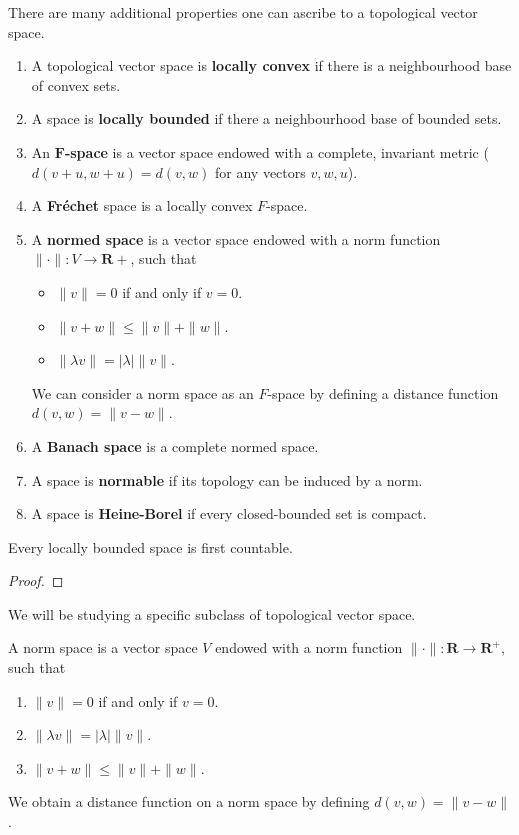 \begin{definition}
    There are many additional properties one can ascribe to a topological vector space.
    \begin{enumerate}
        \item A topological vector space is {\bf locally convex} if there is a neighbourhood base of convex sets.
        \item A space is {\bf locally bounded} if there a neighbourhood base of bounded sets.
        \item An {\bf $\mathbf{F}$-space} is a vector space endowed with a complete, invariant metric ($d(v + u, w + u) = d(v,w)$ for any vectors $v,w,u$).
        \item A {\bf Fr\'{e}chet} space is a locally convex $F$-space.
        \item A {\bf normed space} is a vector space endowed with a norm function $\| \cdotp \|: V \to \mathbf{R}+$, such that
        \begin{itemize}
            \item $\| v \| = 0$ if and only if $v = 0$.
            \item $\| v + w \| \leq \| v \| + \| w \|$.
            \item $\| \lambda v \| = | \lambda | \| v \|$.
        \end{itemize}
        We can consider a norm space as an $F$-space by defining a distance function $d(v,w) = \| v - w \|$.
        \item A {\bf Banach space} is a complete normed space.
        \item A space is {\bf normable} if its topology can be induced by a norm.
        \item A space is {\bf Heine-Borel} if every closed-bounded set is compact.
    \end{enumerate}
\end{definition}

\begin{theorem}
    Every locally bounded space is first countable.
\end{theorem}
\begin{proof}
    
\end{proof}

We will be studying a specific subclass of topological vector space.

\begin{definition}
    A norm space is a vector space $V$ endowed with a norm function $\| \cdotp \|: \mathbf{R} \to \mathbf{R}^+$, such that
    \begin{enumerate}
        \item $\| v \| = 0$ if and only if $v = 0$.
        \item $\| \lambda v \| = | \lambda | \| v \|$.
        \item $\| v + w \| \leq \| v \| + \| w \|$.
    \end{enumerate}
    We obtain a distance function on a norm space by defining $d(v,w) = \| v - w \|$.
\end{definition}

